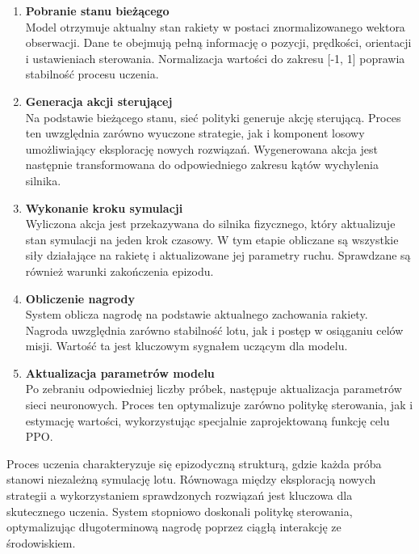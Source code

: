 \begin{enumerate}
    \item \textbf{Pobranie stanu bieżącego} \\
    Model otrzymuje aktualny stan rakiety w postaci znormalizowanego wektora obserwacji. Dane te obejmują pełną informację o pozycji, prędkości, orientacji i ustawieniach sterowania. Normalizacja wartości do zakresu [-1, 1] poprawia stabilność procesu uczenia.

    \item \textbf{Generacja akcji sterującej} \\
    Na podstawie bieżącego stanu, sieć polityki generuje akcję sterującą. Proces ten uwzględnia zarówno wyuczone strategie, jak i komponent losowy umożliwiający eksplorację nowych rozwiązań. Wygenerowana akcja jest następnie transformowana do odpowiedniego zakresu kątów wychylenia silnika.

    \item \textbf{Wykonanie kroku symulacji} \\
    Wyliczona akcja jest przekazywana do silnika fizycznego, który aktualizuje stan symulacji na jeden krok czasowy. W tym etapie obliczane są wszystkie siły działające na rakietę i aktualizowane jej parametry ruchu. Sprawdzane są również warunki zakończenia epizodu.

    \item \textbf{Obliczenie nagrody} \\
    System oblicza nagrodę na podstawie aktualnego zachowania rakiety. Nagroda uwzględnia zarówno stabilność lotu, jak i postęp w osiąganiu celów misji. Wartość ta jest kluczowym sygnałem uczącym dla modelu.

    \item \textbf{Aktualizacja parametrów modelu} \\
    Po zebraniu odpowiedniej liczby próbek, następuje aktualizacja parametrów sieci neuronowych. Proces ten optymalizuje zarówno politykę sterowania, jak i estymację wartości, wykorzystując specjalnie zaprojektowaną funkcję celu PPO.
\end{enumerate}

Proces uczenia charakteryzuje się epizodyczną strukturą, gdzie każda próba stanowi niezależną symulację lotu. Równowaga między eksploracją nowych strategii a wykorzystaniem sprawdzonych rozwiązań jest kluczowa dla skutecznego uczenia. System stopniowo doskonali politykę sterowania, optymalizując długoterminową nagrodę poprzez ciągłą interakcję ze środowiskiem.



